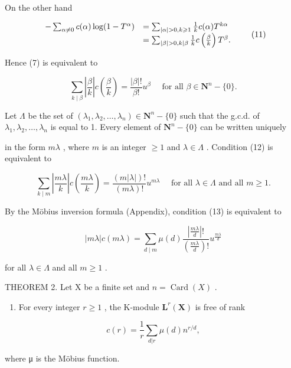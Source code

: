 On the other hand

\[
\begin{array}{r l} - \sum_ {\alpha \neq 0} c (\alpha) \log (1 - T ^ {\alpha}) & = \sum_ {| \alpha | > 0, k \geqslant 1} \frac {1}{k} c (\alpha) T ^ {k \alpha} \\ & = \sum_ {| \beta | > 0, k | \beta} \frac {1}{k} c \left(\frac {\beta}{k}\right) T ^ {\beta}. \end{array}\tag{11}
\]

Hence (7) is equivalent to

\[
\sum_ {k \mid \beta} \left| \frac {\beta}{k} \right| c \left(\frac {\beta}{k}\right) = \frac {| \beta | !}{\beta !} u ^ {\beta} \quad \text { for   all } \beta \in \mathbf {N} ^ {n} - \{0 \}.\tag{12}
\]

Let \(\Lambda\) be the set of \((\lambda_1, \lambda_2, \ldots, \lambda_n) \in \mathbf{N}^n - \{0\}\) such that the g.c.d. of \(\lambda_1, \lambda_2, \ldots, \lambda_n\) is equal to 1. Every element of \(\mathbf{N}^n - \{0\}\) can be written uniquely

in the form \(m\lambda\) , where \(m\) is an integer \(\geqslant 1\) and \(\lambda \in \Lambda\) . Condition (12) is equivalent to

\[
\sum_ {k \mid m} \left| \frac {m \lambda}{k} \right| c \left(\frac {m \lambda}{k}\right) = \frac {(m | \lambda |) !}{(m \lambda) !} u ^ {m \lambda} \quad \text { for   all } \lambda \in \Lambda \text { and   all } m \geqslant 1.\tag{13}
\]

By the Möbius inversion formula (Appendix), condition (13) is equivalent to

\[
\left| m \lambda \right| c (m \lambda) = \sum_ {d \mid m} \mu (d) \frac {\left| \frac {m \lambda}{d} \right| !}{\left(\frac {m \lambda}{d}\right) !} u ^ {\frac {m \lambda}{d}}\tag{14}
\]

for all \(\lambda\in\Lambda\) and all \(m\geqslant1\) .

THEOREM 2. Let X be a finite set and \(n = \operatorname{Card}(X)\) .

\begin{enumerate}
\def\labelenumi{(\alph{enumi})}
\tightlist
\item
  For every integer \(r \geqslant 1\) , the K-module \(\mathbf{L}^r(\mathbf{X})\) is free of rank
\end{enumerate}

\[
c (r) = \frac {1}{r} \sum_ {d | r} \mu (d) n ^ {r / d},\tag{15}
\]

where μ is the Möbius function.

